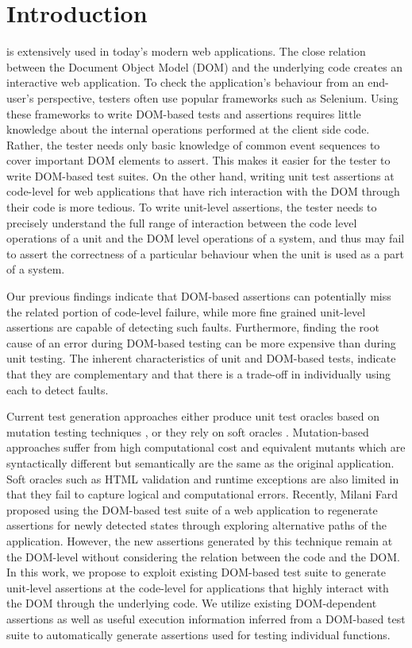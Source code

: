 \section{Introduction} \label{Sec:intro}
\javascript is extensively used in today's modern web applications. The close relation between the Document Object Model (DOM) and the underlying \javascript code creates an interactive web application. To check the application's behaviour from an end-user's perspective, testers often use popular frameworks such as Selenium. Using these frameworks to write DOM-based tests and assertions
requires little knowledge about the internal operations performed at the client side code. Rather, the tester needs only basic knowledge of common event sequences to cover important DOM elements to assert. 
This makes it easier for the tester to write DOM-based test suites. On the other hand,
writing unit test assertions at code-level for web applications that have rich interaction with the DOM through their \javascript code is more tedious. 
To write unit-level assertions, the tester needs to precisely understand the full range of interaction between the code level operations of a unit and the DOM level operations of a system, and thus may fail to assert the correctness of a particular behaviour when the unit is used as a part of a system. 

Our previous findings \cite{mirshokraie:icst15} indicate that DOM-based assertions can potentially miss the related portion of
code-level failure, while more fine grained unit-level assertions are capable of detecting such faults. Furthermore, finding the root cause of an error during DOM-based testing can be more expensive than during unit testing.
The inherent characteristics of unit and DOM-based tests, indicate that they are complementary and that there is a trade-off in individually using each to detect faults. 

Current test generation approaches either produce unit test oracles based on mutation testing techniques \cite{mirshokraie:icst15, fraser:tse12}, or they rely on soft oracles \cite{artzi:icse11}. Mutation-based approaches suffer from high computational cost and equivalent mutants which are syntactically different but semantically are the same as the original application.
Soft oracles such as HTML validation and runtime exceptions are also limited in that they fail to capture logical and computational errors. 
Recently, Milani Fard \etal \cite{milanifard:ase14} proposed using the DOM-based test suite of a web application to regenerate assertions for newly detected states through exploring alternative paths of the application. However, the new assertions generated by this technique remain at the DOM-level without considering the relation between the \javascript code and the DOM.
In this work, we propose to exploit existing DOM-based test suite to generate unit-level assertions at the code-level for applications that highly interact with the DOM through the underlying \javascript code. We utilize
existing DOM-dependent assertions as well as useful execution information inferred from a DOM-based test suite to automatically generate assertions used for testing individual \javascript functions.

